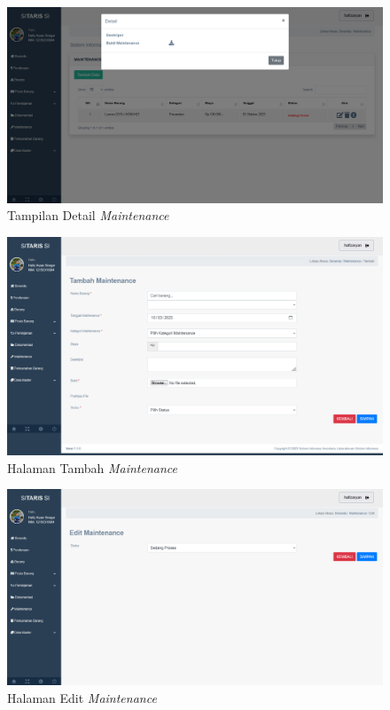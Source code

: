 \begin{enumerate}
        \begin{figure}
          \centering
          \includegraphics[width=0.82\linewidth]{konten//gambar/maintenance detail.png}
          \caption{Tampilan Detail \textit{Maintenance}}
          \label{fig:enter-label}
        \end{figure}

        \begin{figure}
          \centering
          \includegraphics[width=0.82\linewidth]{konten//gambar/maintenance tambah.png}
          \caption{Halaman Tambah \textit{Maintenance}}
          \label{fig:enter-label}
        \end{figure}

        \begin{figure}
          \centering
          \includegraphics[width=0.82\linewidth]{konten//gambar/maintenance edit.png}
          \caption{Halaman Edit \textit{Maintenance}}
          \label{fig:enter-label}
        \end{figure}


\end{enumerate}
